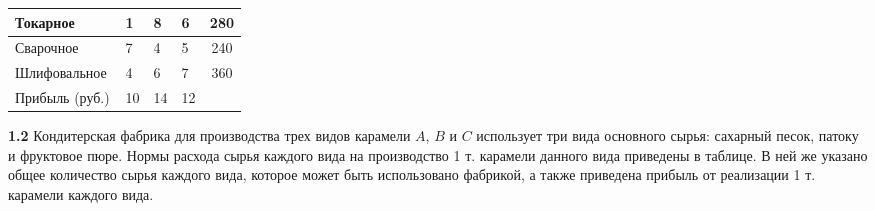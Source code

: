 \documentclass[10pt, a5paper, twoside]{article} %
\begin{document}
\begin{table}[h]
\begin{tabular}{|l|p{0.12\linewidth}|p{0.12\linewidth}|p{0.12\linewidth}|c|}
Токарное                          & 1                                             & 8                                             & 6                                            & 280                                                                                                           \\ \hline
Сварочное                         & 7                                             & 4                                             & 5                                            & 240                                                                                                           \\ \hline
Шлифовальное                      & 4                                             & 6                                             & 7                                            & 360                                                                                                           \\ \hline
Прибыль (руб.)                    & 10                                            & 14                                            & 12                                           &                                                                                                               \\ \hline
\end{tabular}
\end{table}
\vspace{6pt}

\textbf{1.2} Кондитерская фабрика для производства трех видов карамели $A$, $B$ и $C$ использует три вида основного сырья: сахарный песок, патоку и фруктовое пюре. Нормы расхода сырья каждого вида на производство 1 т. карамели данного вида приведены в таблице. В ней же указано общее количество сырья каждого вида, которое может быть использовано фабрикой, а также приведена прибыль от реализации 1 т. карамели каждого вида.
\end{document}
